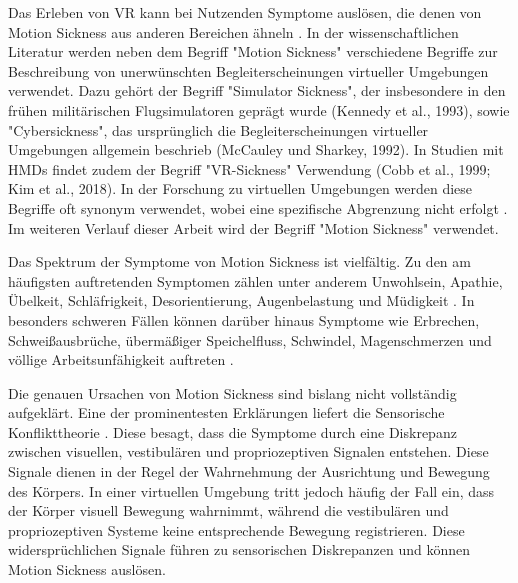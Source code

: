 Das Erleben von VR kann bei Nutzenden Symptome auslösen, die denen von Motion Sickness aus anderen Bereichen ähneln \citep{somrak_estimating_2019}. In der wissenschaftlichen Literatur werden neben dem Begriff "Motion Sickness" verschiedene Begriffe zur Beschreibung von unerwünschten Begleiterscheinungen virtueller Umgebungen verwendet. Dazu gehört der Begriff "Simulator Sickness", der insbesondere in den frühen militärischen Flugsimulatoren geprägt wurde (Kennedy et al., 1993), sowie "Cybersickness", das ursprünglich die Begleiterscheinungen virtueller Umgebungen allgemein beschrieb (McCauley und Sharkey, 1992). In Studien mit HMDs findet zudem der Begriff "VR-Sickness" Verwendung (Cobb et al., 1999; Kim et al., 2018). In der Forschung zu virtuellen Umgebungen werden diese Begriffe oft synonym verwendet, wobei eine spezifische Abgrenzung nicht erfolgt \citep{saredakis_factors_2020}. Im weiteren Verlauf dieser Arbeit wird der Begriff "Motion Sickness" verwendet. 

Das Spektrum der Symptome von Motion Sickness ist vielfältig. Zu den am häufigsten auftretenden Symptomen zählen unter anderem Unwohlsein, Apathie, Übelkeit, Schläfrigkeit, Desorientierung, Augenbelastung und Müdigkeit \citep{somrak_estimating_2019}. In besonders schweren Fällen können darüber hinaus Symptome wie Erbrechen, Schweißausbrüche, übermäßiger Speichelfluss, Schwindel, Magenschmerzen und völlige Arbeitsunfähigkeit auftreten \citep{kennedy_research_2010}. 

Die genauen Ursachen von Motion Sickness sind bislang nicht vollständig aufgeklärt. Eine der prominentesten Erklärungen liefert die Sensorische Konflikttheorie \citep{oman_motion_1990}. Diese besagt, dass die Symptome durch eine Diskrepanz zwischen visuellen, vestibulären und propriozeptiven Signalen entstehen. Diese Signale dienen in der Regel der Wahrnehmung der Ausrichtung und Bewegung des Körpers. In einer virtuellen Umgebung tritt jedoch häufig der Fall ein, dass der Körper visuell Bewegung wahrnimmt, während die vestibulären und propriozeptiven Systeme keine entsprechende Bewegung registrieren. Diese widersprüchlichen Signale führen zu sensorischen Diskrepanzen und können Motion Sickness auslösen. 

